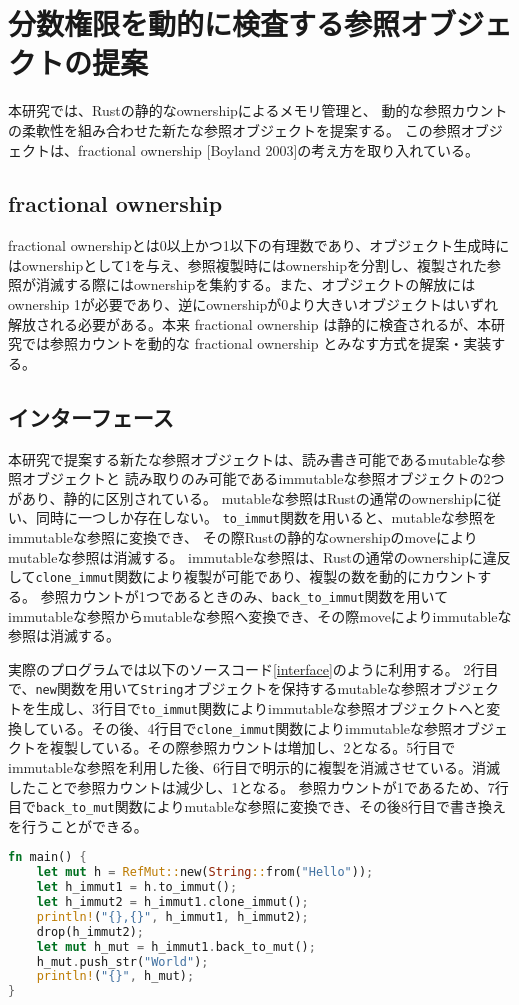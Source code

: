\documentclass{sumiilab-paper}
\theoremstyle{mystyle}
\numberwithin{definition}{chapter} %
\begin{document}
\chapter{分数権限を動的に検査する参照オブジェクトの提案}
本研究では、Rustの静的なownershipによるメモリ管理と、
動的な参照カウントの柔軟性を組み合わせた新たな参照オブジェクトを提案する。
この参照オブジェクトは、fractional ownership [Boyland 2003]の考え方を取り入れている。

\section{fractional ownership}
fractional ownershipとは0以上かつ1以下の有理数であり、オブジェクト生成時にはownershipとして1を与え、参照複製時にはownershipを分割し、複製された参照が消滅する際にはownershipを集約する。また、オブジェクトの解放にはownership 1が必要であり、逆にownershipが0より大きいオブジェクトはいずれ解放される必要がある。本来 fractional ownership は静的に検査されるが、本研究では参照カウントを動的な fractional ownership とみなす方式を提案・実装する。

\section{インターフェース}
本研究で提案する新たな参照オブジェクトは、読み書き可能であるmutableな参照オブジェクトと
読み取りのみ可能であるimmutableな参照オブジェクトの2つがあり、静的に区別されている。
mutableな参照はRustの通常のownershipに従い、同時に一つしか存在しない。
\texttt{to\_immut}関数を用いると、mutableな参照をimmutableな参照に変換でき、
その際Rustの静的なownershipのmoveによりmutableな参照は消滅する。
immutableな参照は、Rustの通常のownershipに違反して\texttt{clone\_immut}関数により複製が可能であり、複製の数を動的にカウントする。
参照カウントが1つであるときのみ、\texttt{back\_to\_immut}関数を用いてimmutableな参照からmutableな参照へ変換でき、その際moveによりimmutableな参照は消滅する。

実際のプログラムでは以下のソースコード\ref{interface}のように利用する。
2行目で、\texttt{new}関数を用いて\texttt{String}オブジェクトを保持するmutableな参照オブジェクトを生成し、3行目で\texttt{to\_immut}関数によりimmutableな参照オブジェクトへと変換している。その後、4行目で\texttt{clone\_immut}関数によりimmutableな参照オブジェクトを複製している。その際参照カウントは増加し、2となる。5行目でimmutableな参照を利用した後、6行目で明示的に複製を消滅させている。消滅したことで参照カウントは減少し、1となる。
参照カウントが1であるため、7行目で\texttt{back\_to\_mut}関数によりmutableな参照に変換でき、その後8行目で書き換えを行うことができる。
\begin{lstlisting}[language=Rust, caption=新たな参照オブジェクトの利用例, label=interface, captionpos=b]
fn main() {
    let mut h = RefMut::new(String::from("Hello"));
    let h_immut1 = h.to_immut();
    let h_immut2 = h_immut1.clone_immut();
    println!("{},{}", h_immut1, h_immut2);
    drop(h_immut2);
    let mut h_mut = h_immut1.back_to_mut();
    h_mut.push_str("World");
    println!("{}", h_mut);
}
\end{lstlisting}
\end{document}
